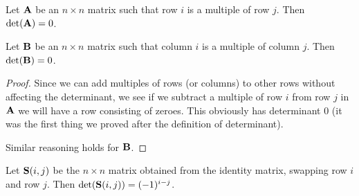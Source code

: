 \begin{theorem}
Let $\mathbf{A}$ be an $n\times n$ matrix such that row $i$ is a multiple
of row $j$. Then $\det(\mathbf{A})=0$.

Let $\mathbf{B}$ be an $n\times n$ matrix such that column $i$ is a
multiple of column $j$. Then $\det(\mathbf{B})=0$.
\end{theorem}
\begin{proof}
Since we can add multiples of rows (or columns) to other rows without
affecting the determinant, we see if we subtract a multiple of row $i$
from row $j$ in $\mathbf{A}$ we will have a row consisting of zeroes. This
obviously has determinant 0 (it was the first thing we proved after the
definition of determinant).

Similar reasoning holds for $\mathbf{B}$.
\end{proof}

\begin{lemma}
Let $\mathbf{S}(i,j)$ be the $n\times n$ matrix obtained from the identity
matrix, swapping row $i$ and row $j$. Then
$\det(\mathbf{S}(i,j)) = (-1)^{i-j}$.
\end{lemma}

